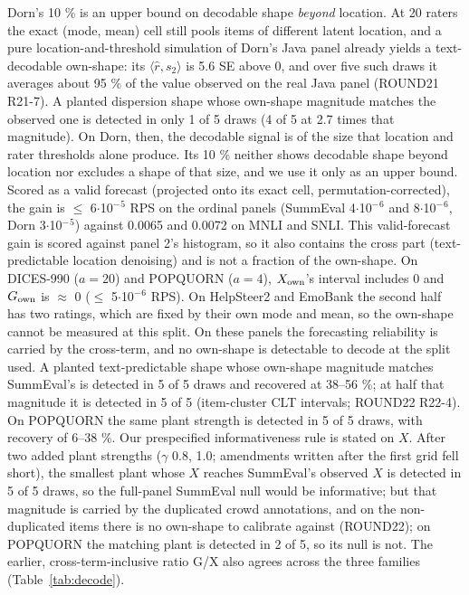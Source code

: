 \documentclass[10pt,twocolumn]{article}
\begin{document}
Dorn's 10 \% is an upper bound on decodable shape \emph{beyond} location. At 20 raters the exact (mode, mean) cell still pools items of different latent location, and a pure location-and-threshold simulation of Dorn's Java panel already yields a text-decodable own-shape: its \(\langle\hat r, s_2\rangle\) is 5.6 SE above 0, and over five such draws it averages about 95 \% of the value observed on the real Java panel (ROUND21 R21-7). A planted dispersion shape whose own-shape magnitude matches the observed one is detected in only 1 of 5 draws (4 of 5 at 2.7 times that magnitude). On Dorn, then, the decodable signal is of the size that location and rater thresholds alone produce. Its 10 \% neither shows decodable shape beyond location nor excludes a shape of that size, and we use it only as an upper bound. Scored as a valid forecast (projected onto its exact cell, permutation-corrected), the gain is $\leq$ 6$\cdot$10$^{-}$$^{5}$ RPS on the ordinal panels (SummEval 4$\cdot$10$^{-}$$^{6}$ and 8$\cdot$10$^{-}$$^{6}$, Dorn 3$\cdot$10$^{-}$$^{5}$) against 0.0065 and 0.0072 on MNLI and SNLI. This valid-forecast gain is scored against panel 2's histogram, so it also contains the cross part (text-predictable location denoising) and is not a fraction of the own-shape. On DICES-990 (\(a=20\)) and POPQUORN (\(a=4\)), \(X_{\rm own}\)'s interval includes 0 and \(G_{\rm own}\) is $\approx$ 0 ($\leq$ 5$\cdot$10$^{-}$$^{6}$ RPS). On HelpSteer2 and EmoBank the second half has two ratings, which are fixed by their own mode and mean, so the own-shape cannot be measured at this split. On these panels the forecasting reliability is carried by the cross-term, and no own-shape is detectable to decode at the split used. A planted text-predictable shape whose own-shape magnitude matches SummEval's is detected in 5 of 5 draws and recovered at 38--56 \%; at half that magnitude it is detected in 5 of 5 (item-cluster CLT intervals; ROUND22 R22-4). On POPQUORN the same plant strength is detected in 5 of 5 draws, with recovery of 6--38 \%. Our prespecified informativeness rule is stated on \(X\). After two added plant strengths ($\gamma$ 0.8, 1.0; amendments written after the first grid fell short), the smallest plant whose \(X\) reaches SummEval's observed \(X\) is detected in 5 of 5 draws, so the full-panel SummEval null would be informative; but that magnitude is carried by the duplicated crowd annotations, and on the non-duplicated items there is no own-shape to calibrate against (ROUND22); on POPQUORN the matching plant is detected in 2 of 5, so its null is not. The earlier, cross-term-inclusive ratio G/X also agrees across the three families (Table~\ref{tab:decode}).
\end{document}
